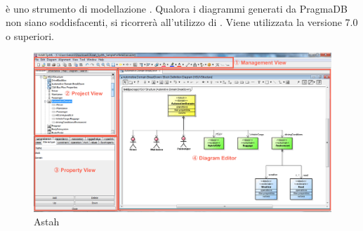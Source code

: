   \paragraph{}
   è uno strumento di modellazione . Qualora i diagrammi  generati da PragmaDB non siano soddisfacenti, si ricorrerà all'utilizzo di . Viene utilizzata la versione 7.0 o superiori.
\begin{figure}[h]
\centering
\includegraphics[scale=0.3]{img/astah.png}
\caption{Astah}\label{sec:Figura1}
\end{figure}

\newpage


  
